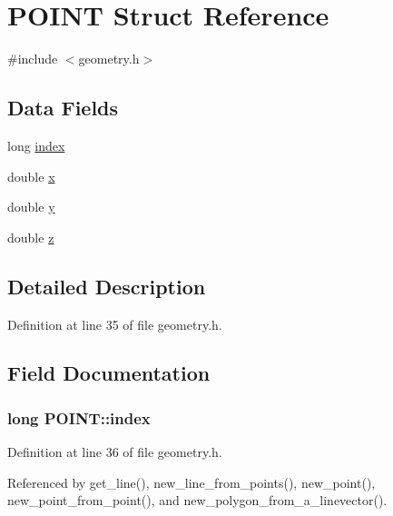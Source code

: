 \hypertarget{struct_p_o_i_n_t}{\section{P\-O\-I\-N\-T Struct Reference}
\label{struct_p_o_i_n_t}
}


{\ttfamily \#include $<$geometry.\-h$>$}

\subsection*{Data Fields}
\begin{DoxyCompactItemize}
\item 
long \hyperlink{struct_p_o_i_n_t_af43db8aeed3c7300f3738010af476a74}{index}
\item 
double \hyperlink{struct_p_o_i_n_t_ad8ef67a3b41f849814762c55ba75267e}{x}
\item 
double \hyperlink{struct_p_o_i_n_t_a2ce6f1bab91fb36c849051a06750e5b0}{y}
\item 
double \hyperlink{struct_p_o_i_n_t_ad5800e6b529b273f398389905059fd26}{z}
\end{DoxyCompactItemize}


\subsection{Detailed Description}


Definition at line 35 of file geometry.\-h.



\subsection{Field Documentation}
\hypertarget{struct_p_o_i_n_t_af43db8aeed3c7300f3738010af476a74}{
\subsubsection[{index}]{\setlength{\rightskip}{0pt plus 5cm}long P\-O\-I\-N\-T\-::index}}\label{struct_p_o_i_n_t_af43db8aeed3c7300f3738010af476a74}


Definition at line 36 of file geometry.\-h.



Referenced by get\-\_\-line(), new\-\_\-line\-\_\-from\-\_\-points(), new\-\_\-point(), new\-\_\-point\-\_\-from\-\_\-point(), and new\-\_\-polygon\-\_\-from\-\_\-a\-\_\-linevector().


